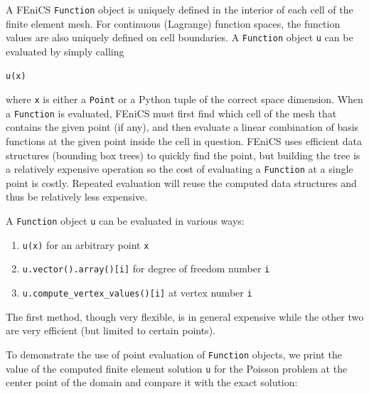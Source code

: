 \documentclass[graybox,envcountchap,sectrefs,final]{svmonodo}
\newenvironment{warning_mdfboxadmon}[1][]{
\begin{warning_mdfboxmdframed}[frametitle=#1]
}
{
\end{warning_mdfboxmdframed}
}
\begin{document}

A FEniCS \texttt{Function} object is uniquely defined in the interior
of each cell of the finite element mesh. For continuous (Lagrange)
function spaces, the function values are also uniquely defined on
cell boundaries. A \texttt{Function} object \texttt{u} can be evaluated by simply
calling

\begin{lstlisting}[language=Python,style=graycolor]
u(x)
\end{lstlisting}
where \texttt{x} is either a \texttt{Point} or a Python tuple of the correct space
dimension. When a \texttt{Function} is evaluated, FEniCS must first find
which cell of the mesh that contains the given point (if any), and
then evaluate a linear combination of basis functions at the given
point inside the cell in question. FEniCS uses efficient data
structures (bounding box trees) to quickly find the point, but
building the tree is a relatively expensive operation so the cost of
evaluating a \texttt{Function} at a single point is costly. Repeated
evaluation will reuse the computed data structures and thus be
relatively less expensive.


\begin{warning_mdfboxadmon}
A \texttt{Function} object \texttt{u} can be evaluated in various ways:

\begin{enumerate}
\item \texttt{u(x)} for an arbitrary point \texttt{x}

\item \texttt{u.vector().array()[i]} for degree of freedom number \texttt{i}

\item \Verb!u.compute_vertex_values()[i]! at vertex number \texttt{i}
\end{enumerate}

\noindent
The first method, though very flexible, is in general expensive
while the other two are very efficient (but limited to certain points).
\end{warning_mdfboxadmon} %



To demonstrate the use of point evaluation of \texttt{Function} objects, we
print the value of the computed finite element solution \texttt{u} for the
Poisson problem at the center point of the domain and compare it with
the exact solution:
\end{document}
